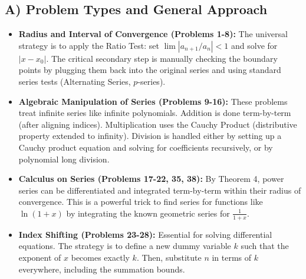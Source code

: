 \documentclass[11pt, letterpaper]{article}
\theoremstyle{definition}
\theoremstyle{remark}
\begin{document}
\subsection{A) Problem Types and General Approach}
\begin{itemize}
    \item \textbf{Radius and Interval of Convergence (Problems 1-8):} The universal strategy is to apply the Ratio Test: set $\lim |a_{n+1}/a_n| < 1$ and solve for $|x - x_0|$. The critical secondary step is manually checking the boundary points by plugging them back into the original series and using standard series tests (Alternating Series, $p$-series).
    \item \textbf{Algebraic Manipulation of Series (Problems 9-16):} These problems treat infinite series like infinite polynomials. Addition is done term-by-term (after aligning indices). Multiplication uses the Cauchy Product (distributive property extended to infinity). Division is handled either by setting up a Cauchy product equation and solving for coefficients recursively, or by polynomial long division.
    \item \textbf{Calculus on Series (Problems 17-22, 35, 38):} By Theorem 4, power series can be differentiated and integrated term-by-term within their radius of convergence. This is a powerful trick to find series for functions like $\ln(1+x)$ by integrating the known geometric series for $\frac{1}{1+x}$.
    \item \textbf{Index Shifting (Problems 23-28):} Essential for solving differential equations. The strategy is to define a new dummy variable $k$ such that the exponent of $x$ becomes exactly $k$. Then, substitute $n$ in terms of $k$ everywhere, including the summation bounds.
\end{itemize}
\end{document}
